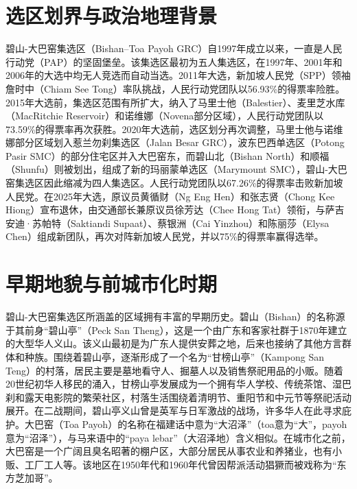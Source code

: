 \documentclass[11pt,a4paper,twoside,openany]{book}
\begin{document}
\section{选区划界与政治地理背景}
碧山-大巴窑集选区（Bishan–Toa Payoh GRC）自1997年成立以来，一直是人民行动党（PAP）的坚固堡垒。该集选区最初为五人集选区，在1997年、2001年和2006年的大选中均无人竞选而自动当选。2011年大选，新加坡人民党（SPP）领袖詹时中（Chiam See Tong）率队挑战，人民行动党团队以56.93\%的得票率险胜。2015年大选前，集选区范围有所扩大，纳入了马里士他（Balestier）、麦里芝水库（MacRitchie Reservoir）和诺维娜（Novena部分区域），人民行动党团队以73.59\%的得票率再次获胜。2020年大选前，选区划分再次调整，马里士他与诺维娜部分区域划入惹兰勿刹集选区（Jalan Besar GRC），波东巴西单选区（Potong Pasir SMC）的部分住宅区并入大巴窑东，而碧山北（Bishan North）和顺福（Shunfu）则被划出，组成了新的玛丽蒙单选区（Marymount SMC），碧山-大巴窑集选区因此缩减为四人集选区。人民行动党团队以67.26\%的得票率击败新加坡人民党。在2025年大选，原议员黄循财（Ng Eng Hen）和张志贤（Chong Kee Hiong）宣布退休，由交通部长兼原议员徐芳达（Chee Hong Tat）领衔，与萨吉安迪·苏帕特（Saktiandi Supaat）、蔡银洲（Cai Yinzhou）和陈丽莎（Elysa Chen）组成新团队，再次对阵新加坡人民党，并以75\%的得票率赢得选举。

\section{早期地貌与前城市化时期}
碧山-大巴窑集选区所涵盖的区域拥有丰富的早期历史。碧山（Bishan）的名称源于其前身“碧山亭”（Peck San Theng），这是一个由广东和客家社群于1870年建立的大型华人义山。该义山最初是为广东人提供安葬之地，后来也接纳了其他方言群体和种族。围绕着碧山亭，逐渐形成了一个名为“甘榜山亭”（Kampong San Teng）的村落，居民主要是墓地看守人、掘墓人以及销售祭祀用品的小贩。随着20世纪初华人移民的涌入，甘榜山亭发展成为一个拥有华人学校、传统茶馆、湿巴刹和露天电影院的繁荣社区，村落生活围绕着清明节、重阳节和中元节等祭祀活动展开。在二战期间，碧山亭义山曾是英军与日军激战的战场，许多华人在此寻求庇护。大巴窑（Toa Payoh）的名称在福建话中意为“大沼泽”（toa意为“大”，payoh意为“沼泽”），与马来语中的“paya lebar”（大沼泽地）含义相似。在城市化之前，大巴窑是一个广阔且臭名昭著的棚户区，大部分居民从事农业和养猪业，也有小贩、工厂工人等。该地区在1950年代和1960年代曾因帮派活动猖獗而被戏称为“东方芝加哥”。
\end{document}
